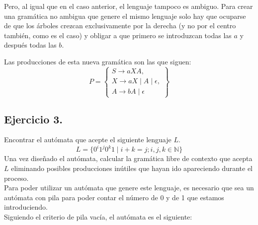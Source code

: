 \documentclass[11pt,a4paper]{article}
\begin{document}
\begin{enumerate}[a)]
	Pero, al igual que en el caso anterior, el lenguaje tampoco es ambiguo. Para crear una gramática no ambigua que genere el mismo lenguaje solo hay que ocuparse de que los árboles crezcan exclusivamente por la derecha (y no por el centro también, como es el caso) y obligar a que primero se introduzcan todas las $a$ y después todas las $b$.

	Las producciones de esta nueva gramática son las que siguen:
	\[P=\left\{\begin{array}{c}
			S\rightarrow aXA, \\
			X\rightarrow aX\mid A\mid \epsilon, \\
			A\rightarrow bA\mid \epsilon
		\end{array}\right\}\]
	\end{enumerate}
	
\subsection{Ejercicio 3.} Encontrar el autómata que acepte el siguiente lenguaje $L$.
\[L=\{0^i1^j0^k1\mid i+k=j; i,j,k\in \mathbb{N}\}\]
Una vez diseñado el autómata, calcular la gramática libre de contexto que acepta $L$ eliminando posibles producciones inútiles que hayan ido apareciendo durante el proceso.\\

Para poder utilizar un autómata que genere este lenguaje, es necesario que sea un autómata con pila para poder contar el número de 0 y de 1 que estamos introduciendo. \\

Siguiendo el criterio de pila vacía, el autómata es el siguiente:
\end{document}
